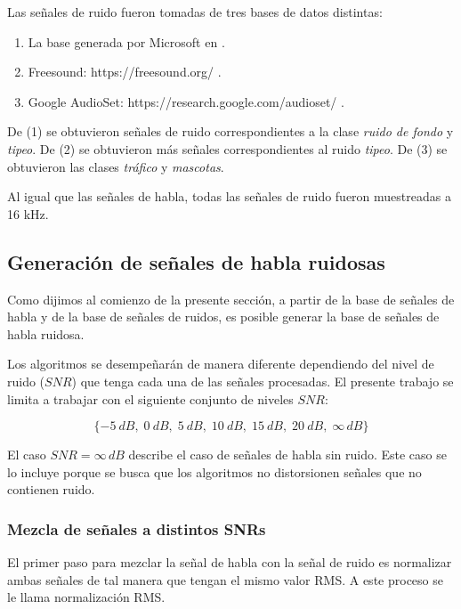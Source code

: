 Las señales de ruido fueron tomadas de tres bases de datos distintas:

\begin{enumerate}
	\item La base generada por Microsoft en \cite{a_scalable_noisy_speech_dataset_and_online_subjective_test_framework}.
	\item Freesound: https://freesound.org/ .
	\item Google AudioSet: https://research.google.com/audioset/ .
\end{enumerate}

De (1) se obtuvieron señales de ruido correspondientes a la clase \emph{ruido de fondo} y \emph{tipeo}. De (2) se obtuvieron más señales correspondientes al ruido \emph{tipeo}. De (3) se obtuvieron las clases \emph{tráfico} y \emph{mascotas}.

Al igual que las señales de habla, todas las señales de ruido fueron muestreadas a 16 kHz.

\subsection{Generación de señales de habla ruidosas}
\label{sec:noisy_signals_generation}

Como dijimos al comienzo de la presente sección, a partir de la base de señales de habla y de la base de señales de ruidos, es posible generar la base de señales de habla ruidosa. 

Los algoritmos se desempeñarán de manera diferente dependiendo del nivel de ruido ($SNR$) que tenga cada una de las señales procesadas. El presente trabajo se limita a trabajar con el siguiente conjunto de niveles $SNR$:

\begin{equation*}
	\{ \SI{-5}{dB}, \; \SI{0}{dB}, \; \SI{5}{dB}, \; \SI{10}{dB}, \; \SI{15}{dB}, \; \SI{20}{dB}, \; \infty \, \si{dB} \}
\end{equation*}

El caso $SNR = \infty \, \si{dB}$ describe el caso de señales de habla sin ruido. Este caso se lo incluye porque se busca que los algoritmos no distorsionen señales que no contienen ruido.

\subsubsection{Mezcla de señales a distintos SNRs}

El primer paso para mezclar la señal de habla con la señal de ruido es normalizar ambas señales de tal manera que tengan el mismo valor RMS. A este proceso se le llama normalización RMS.

